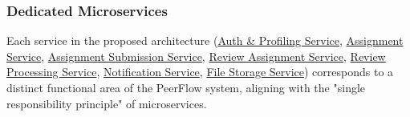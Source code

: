 \subsubsection{Dedicated Microservices}

\begin{justify}
    Each service in the proposed architecture (\hyperref[def:AuthProfilingService]{Auth \& Profiling Service}, \hyperref[def:AssignmentService]{Assignment Service}, \hyperref[def:AssignmentSubmissionService]{Assignment Submission Service}, \hyperref[def:ReviewAssignmentService]{Review Assignment Service}, \hyperref[def:ReviewProcessingService]{Review Processing Service}, \hyperref[def:NotificationService]{Notification Service}, \hyperref[def:FileStorageService]{File Storage Service}) corresponds to a distinct functional area of the PeerFlow system, aligning with the "single responsibility principle" of microservices.
\end{justify}
